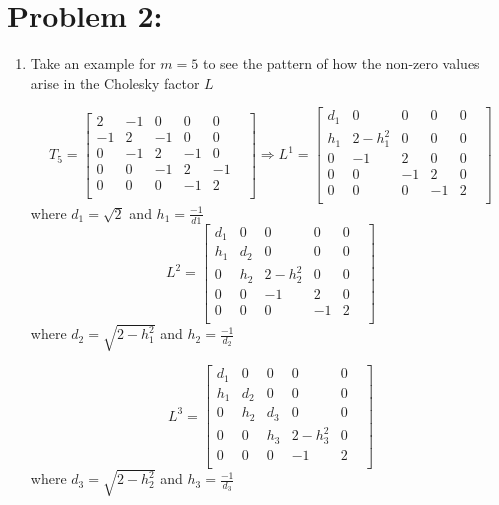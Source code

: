\newpage
\section*{Problem 2:}
\begin{enumerate}
\item Take an example for $m=5$ to see the pattern of how the non-zero values arise in the Cholesky factor $L$

$$
T_{5} = 
\begin{bmatrix}
2  & -1 & 0  & 0  & 0  &\\
-1 & 2  & -1 & 0  & 0  &\\
0  & -1 & 2  & -1 & 0  &\\
0  & 0  & -1 & 2  & -1 &\\
0  & 0  & 0  & -1 & 2  &\\
\end{bmatrix}
\Longrightarrow 
L^{1} = 
\begin{bmatrix}
d_{1} &  0           & 0  & 0  & 0  &\\
h_{1} & 2-h_{1}^{2}  & 0  & 0  & 0  &\\
0     & -1           & 2  &  0 & 0  &\\
0     & 0            & -1 & 2  & 0 &\\
0     & 0            & 0  & -1 & 2  &\\
\end{bmatrix}
$$
where $d_{1} = \sqrt{2}$ and $h_{1}= \frac{-1}{d1}$
$$
L^{2} = 
\begin{bmatrix}
d_{1} & 0     & 0            & 0  & 0  &\\
h_{1} & d_{2} &  0           & 0  & 0  &\\
0     & h_{2} & 2-h_{2}^{2}  &  0 & 0  &\\
0     & 0     & -1           & 2  &  0 &\\
0     & 0     & 0            & -1 & 2  &\\
\end{bmatrix}
$$
where $d_{2} = \sqrt{2-h_{1}^{2}}$ and $h_{2}= \frac{-1}{d_{2}}$

$$
L^{3} = 
\begin{bmatrix}
d_{1} & 0     & 0      & 0            & 0  &\\
h_{1} & d_{2} & 0      & 0            & 0  &\\
0     & h_{2} & d_{3}  & 0            & 0  &\\
0     & 0     & h_{3}  & 2-h_{3}^{2}  & 0  &\\
0     & 0     & 0      & -1           & 2  &\\
\end{bmatrix}
$$
where $d_{3} = \sqrt{2-h_{2}^{2}}$ and $h_{3}= \frac{-1}{d_{3}}$


\end{enumerate}
